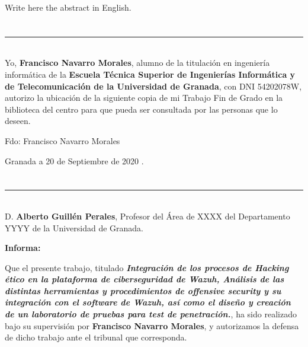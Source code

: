 Write here the abstract in English.

\chapter*{}
\thispagestyle{empty}

\noindent\rule[-1ex]{\textwidth}{2pt}\\[4.5ex]

Yo, \textbf{Francisco Navarro Morales}, alumno de la titulación en ingeniería informática de la \textbf{Escuela Técnica Superior
de Ingenierías Informática y de Telecomunicación de la Universidad de Granada}, con DNI 54202078W, autorizo la
ubicación de la siguiente copia de mi Trabajo Fin de Grado en la biblioteca del centro para que pueda ser
consultada por las personas que lo deseen.

\vspace{6cm}

\noindent Fdo: Francisco Navarro Morales

\vspace{2cm}

\begin{flushright}
Granada a 20 de Septiembre de 2020 .
\end{flushright}


\chapter*{}
\thispagestyle{empty}

\noindent\rule[-1ex]{\textwidth}{2pt}\\[4.5ex]

D. \textbf{Alberto Guillén Perales}, Profesor del Área de XXXX del Departamento YYYY de la Universidad de Granada.


\vspace{0.5cm}

\textbf{Informa:}

\vspace{0.5cm}

Que el presente trabajo, titulado \textit{\textbf{Integración de los procesos de Hacking ético en la plataforma de ciberseguridad de Wazuh, Análisis de las distintas herramientas y procedimientos de offensive security y su integración con el software de Wazuh, así como el diseño y creación de un laboratorio de pruebas para test de penetración.}},
ha sido realizado bajo su supervisión por \textbf{Francisco Navarro Morales}, y autorizamos la defensa de dicho trabajo ante el tribunal
que corresponda.

